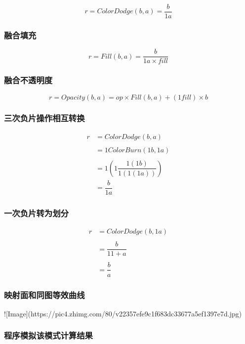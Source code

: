 $$r=ColorDodge(b,a)=\dfrac{b}{1a}$$

\subsubsection{ 融合填充}

$$r= Fill(b,a) =\dfrac{b}{1a\times fill} $$

\subsubsection{ 融合不透明度}

$$r=Opacity(b,a)=op\times Fill(b,a)+(1fill)\times b$$

\subsubsection{ 三次负片操作相互转换}

$$\begin{aligned}
	r&=ColorDodge(b,a)\\&\\&= 1ColorBurn(1b,1a)\\&\\& =1(1\dfrac{1(1b)}{1(1(1a))})\\&=\dfrac{b}{1a}
\end{aligned}$$

\subsubsection{ 一次负片转为划分}

$$\begin{aligned}
	r&=ColorDodge(b,1a)\\\\&= \dfrac{b}{11+a}\\\\&=\dfrac{b}{a}
\end{aligned}$$

\subsubsection{ 映射面和同图等效曲线}

![Image](https://pic4.zhimg.com/80/v22357efe9c1f683dc33677a5ef1397e7d.jpg)

\subsubsection{ 程序模拟该模式计算结果}

